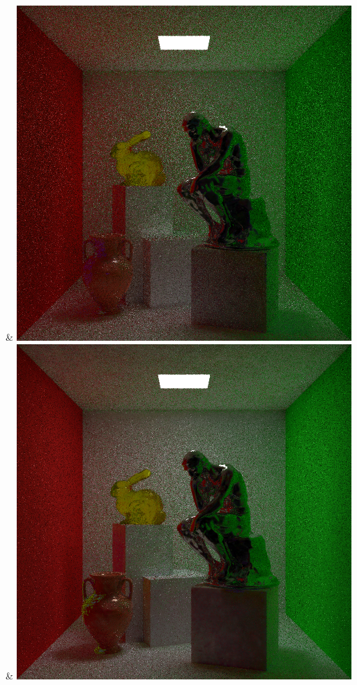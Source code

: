& \includegraphics[width=\linewidth]{figures/py/tests/path_termination/sah_1spp_thinker.png}
& \includegraphics[width=\linewidth]{figures/py/tests/path_termination/bth_1spp_thinker.png}
